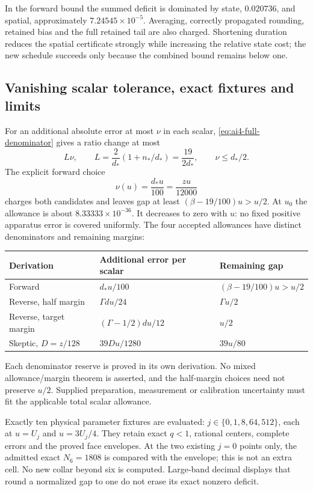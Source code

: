In the forward bound the summed deficit is dominated by state, $0.020736$, and spatial, approximately $7.24545\times10^{-5}$. Averaging, correctly propagated rounding, retained bias and the full retained tail are also charged. Shortening duration reduces the spatial certificate strongly while increasing the relative state cost; the new schedule succeeds only because the combined bound remains below one.

\subsection{Vanishing scalar tolerance, exact fixtures and limits}
For an additional absolute error at most $\nu$ in each scalar, \eqref{eq:ai4-full-denominator} gives a ratio change at most
\begin{equation}
 L\nu,\qquad L=\frac2{d_*}(1+n_*/d_*)=\frac{19}{2d_*},
 \qquad\nu\le d_*/2.
\end{equation}
The explicit forward choice
\begin{equation}
 \nu(u)=\frac{d_*u}{100}=\frac{zu}{12000}
 \label{eq:ai4-scalar-tolerance}
\end{equation}
charges both candidates and leaves gap at least $(\beta-19/100)u>u/2$. At $u_0$ the allowance is about $8.33333\times10^{-36}$. It decreases to zero with $u$: no fixed positive apparatus error is covered uniformly. The four accepted allowances have distinct denominators and remaining margins:
\begin{center}\small
\begin{tabular}{@{}lll@{}}\toprule
Derivation & Additional error per scalar & Remaining gap\\\midrule
Forward & $d_*u/100$ & $(\beta-19/100)u>u/2$\\
Reverse, half margin & $\Gamma du/24$ & $\Gamma u/2$\\
Reverse, target margin & $(\Gamma-1/2)du/12$ & $u/2$\\
Skeptic, $D=z/128$ & $39Du/1280$ & $39u/80$\\\bottomrule
\end{tabular}
\end{center}
Each denominator reserve is proved in its own derivation. No mixed allowance/margin theorem is asserted, and the half-margin choices need not preserve $u/2$. Supplied preparation, measurement or calibration uncertainty must fit the applicable total scalar allowance.

Exactly ten physical parameter fixtures are evaluated: $j\in\{0,1,8,64,512\}$, each at $u=U_j$ and $u=3U_j/4$. They retain exact $q<1$, rational centers, complete errors and the proved face envelopes. At the two existing $j=0$ points only, the admitted exact $N_6=1808$ is compared with the envelope; this is not an extra cell. No new collar beyond six is computed. Large-band decimal displays that round a normalized gap to one do not erase its exact nonzero deficit.

